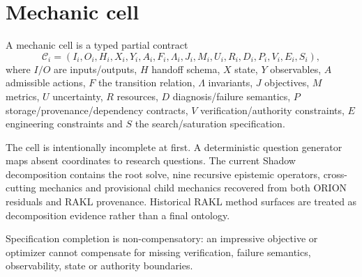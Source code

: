 \section{Mechanic cell}
A mechanic cell is a typed partial contract
\[
\mathcal C_i=(I_i,O_i,H_i,X_i,Y_i,A_i,F_i,\Lambda_i,J_i,M_i,U_i,R_i,D_i,P_i,V_i,E_i,S_i),
\]
where $I/O$ are inputs/outputs, $H$ handoff schema, $X$ state, $Y$ observables, $A$ admissible actions, $F$ the transition relation, $\Lambda$ invariants, $J$ objectives, $M$ metrics, $U$ uncertainty, $R$ resources, $D$ diagnosis/failure semantics, $P$ storage/provenance/dependency contracts, $V$ verification/authority constraints, $E$ engineering constraints and $S$ the search/saturation specification.

The cell is intentionally incomplete at first.  A deterministic question generator maps absent coordinates to research questions.  The current Shadow decomposition contains the root solve, nine recursive epistemic operators, cross-cutting mechanics and provisional child mechanics recovered from both ORION residuals and RAKL provenance.  Historical RAKL method surfaces are treated as decomposition evidence rather than a final ontology.

Specification completion is non-compensatory: an impressive objective or optimizer cannot compensate for missing verification, failure semantics, observability, state or authority boundaries.
